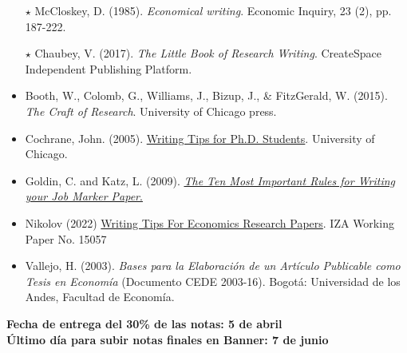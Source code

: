 \documentclass[12pt]{article}
\begin{document}
\begin{itemize}
    \item[{\color{blue} $\star$}] McCloskey, D. (1985). \textit{Economical writing}. Economic Inquiry, 23 (2), pp. 187-222.

    \item[{\color{blue} $\star$}] Chaubey, V. (2017). \textit{The Little Book of Research Writing}. CreateSpace Independent Publishing Platform.

    \item Booth, W., Colomb, G., Williams, J., Bizup, J., \& FitzGerald, W. (2015). \textit{The Craft of Research}. University of Chicago press.   
    
    \item Cochrane, John. (2005). \href{https://www.fma.org/assets/docs/membercontent/writing_cochrane.pdf}{Writing Tips for Ph.D. Students}. University of Chicago.    
 
    \item Goldin, C. and Katz, L. (2009). \href{https://economics.harvard.edu/files/economics/files/tenruleswriting.pdf}{\textit{The Ten Most Important Rules for Writing your Job Marker Paper}.}  
  
    \item Nikolov (2022) \href{https://docs.iza.org/dp15057.pdf}{Writing Tips For Economics Research Papers}. IZA Working Paper No. 15057    
  
    \item Vallejo, H. (2003). \textit{Bases para la Elaboración de un Artículo Publicable como Tesis en Economía} (Documento CEDE 2003-16). Bogotá: Universidad de los Andes, Facultad de Economía.
\end{itemize}

\hspace{1cm}
\begin{center}
\textbf{Fecha de entrega del 30\% de las notas: 5 de abril} \\
\textbf{Último día para subir notas finales en Banner: 7 de junio}    
\end{center}
\end{document}
